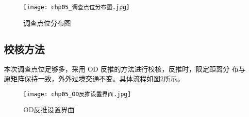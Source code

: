 \begin{figure}[!ht]
  \centering
  \texttt{[image: chp05\_调查点位分布图.jpg]}
  \caption{调查点位分布图\label{fig:chp05_调查点位分布图} }
\end{figure}

\subsection{校核方法}
本次调查点位足够多，采用 OD 反推的方法进行校核，反推时，限定距离分
布与原矩阵保持一致，外外过境交通不变。具体流程如图\ref{fig:chp05_OD反推设置界面}所示。

\begin{figure}[!ht]
  \centering
  \texttt{[image: chp05\_OD反推设置界面.jpg]}
  \caption{OD反推设置界面\label{fig:chp05_OD反推设置界面} }
\end{figure}

